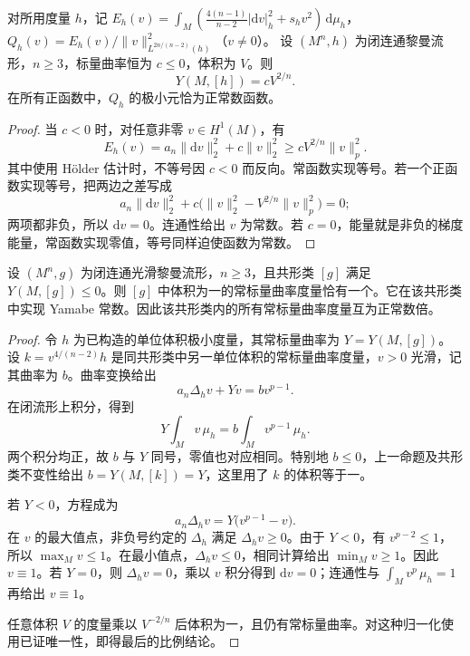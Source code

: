 \begin{proposition}\label{g3:prop:yamabe-nonpositive-constant-metric}
	对所用度量 \(h\)，记 \(E_h(v)=\int_M(\tfrac{4(n-1)}{n-2}|\mathrm dv|_h^2+s_hv^2)\,\mathrm d\mu_h\)，\(Q_h(v)=E_h(v)/\|v\|_{L^{2n/(n-2)}(h)}^2\)（\(v\ne0\)）。
	设 \((M^n,h)\) 为闭连通黎曼流形，\(n\ge3\)，标量曲率恒为 \(c\le0\)，体积为 \(V\)。则
	\[
		Y(M,[h])=cV^{2/n}.
	\]
	在所有正函数中，\(Q_h\) 的极小元恰为正常数函数。
\end{proposition}
\begin{proof}
	当 \(c<0\) 时，对任意非零 \(v\in H^1(M)\)，有
	\[
		E_h(v)=a_n\|\mathrm dv\|_2^2+c\|v\|_2^2
		\ge cV^{2/n}\|v\|_p^2.
	\]
	其中使用 Hölder 估计时，不等号因 \(c<0\) 而反向。常函数实现等号。若一个正函数实现等号，把两边之差写成
	\[
		a_n\|\mathrm dv\|_2^2
		+c\bigl(\|v\|_2^2-V^{2/n}\|v\|_p^2\bigr)=0;
	\]
	两项都非负，所以 \(\mathrm dv=0\)。连通性给出 \(v\) 为常数。若 \(c=0\)，能量就是非负的梯度能量，常函数实现零值，等号同样迫使函数为常数。
\end{proof}

\begin{theorem}\label{g3:thm:yamabe-nonpositive-uniqueness}
	设 \((M^n,g)\) 为闭连通光滑黎曼流形，\(n\ge3\)，且共形类 \([g]\) 满足 \(Y(M,[g])\le0\)。则 \([g]\) 中体积为一的常标量曲率度量恰有一个。它在该共形类中实现 Yamabe 常数。因此该共形类内的所有常标量曲率度量互为正常数倍。
\end{theorem}
\begin{proof}
	令 \(h\) 为已构造的单位体积极小度量，其常标量曲率为 \(Y=Y(M,[g])\)。设 \(k=v^{4/(n-2)}h\) 是同共形类中另一单位体积的常标量曲率度量，\(v>0\) 光滑，记其曲率为 \(b\)。曲率变换给出
	\[
		a_n\Delta_hv+Yv=bv^{p-1}.
	\]
	在闭流形上积分，得到
	\[
		Y\int_Mv\,\mu_h=b\int_Mv^{p-1}\,\mu_h.
	\]
	两个积分均正，故 \(b\) 与 \(Y\) 同号，零值也对应相同。特别地 \(b\le0\)，上一命题及共形类不变性给出 \(b=Y(M,[k])=Y\)，这里用了 \(k\) 的体积等于一。

	若 \(Y<0\)，方程成为
	\[
		a_n\Delta_hv=Y\bigl(v^{p-1}-v\bigr).
	\]
	在 \(v\) 的最大值点，非负号约定的 \(\Delta_h\) 满足 \(\Delta_hv\ge0\)。由于 \(Y<0\)，有 \(v^{p-2}\le1\)，所以 \(\max_Mv\le1\)。在最小值点，\(\Delta_hv\le0\)，相同计算给出 \(\min_Mv\ge1\)。因此 \(v\equiv1\)。若 \(Y=0\)，则 \(\Delta_hv=0\)，乘以 \(v\) 积分得到 \(\mathrm dv=0\)；连通性与 \(\int_Mv^p\,\mu_h=1\) 再给出 \(v\equiv1\)。

	任意体积 \(V\) 的度量乘以 \(V^{-2/n}\) 后体积为一，且仍有常标量曲率。对这种归一化使用已证唯一性，即得最后的比例结论。
\end{proof}

